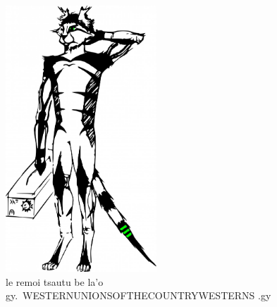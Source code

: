 \documentclass{report}
\newcommand\imageheight{10cm}
\begin{document}
\begin{figure}[ht]
	\centering
	\includegraphics[height=\imageheight]{50x/toolbox/s1v2.jpg}
	\caption[center]{le remoi tsautu be la'o gy.\ WESTERNUNIONSOFTHECOUNTRYWESTERNS .gy}
\end{figure}
\end{document}
